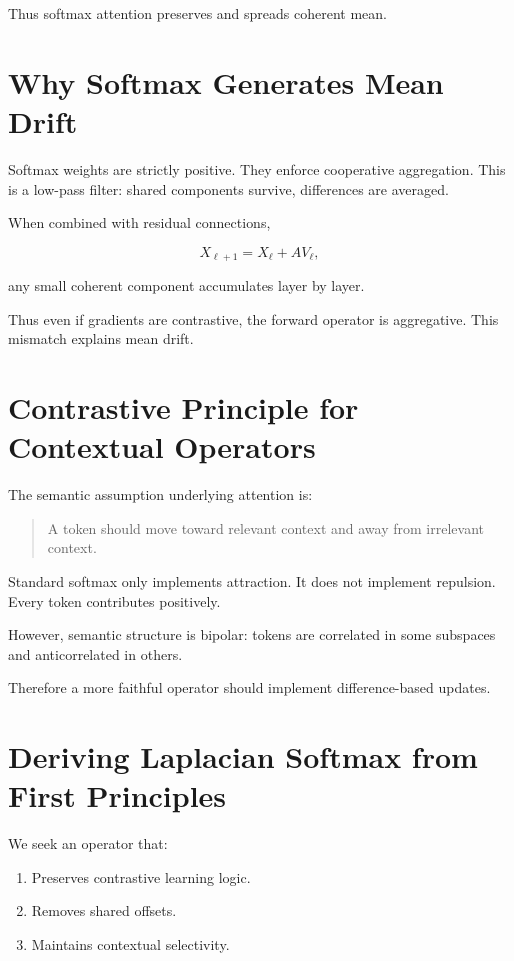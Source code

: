 Thus softmax attention preserves and spreads coherent mean.

\section{Why Softmax Generates Mean Drift}

Softmax weights are strictly positive.
They enforce cooperative aggregation.
This is a low-pass filter:
shared components survive,
differences are averaged.

When combined with residual connections,

\begin{equation}
X_{\ell+1} = X_\ell + AV_\ell,
\end{equation}

any small coherent component
accumulates layer by layer.

Thus even if gradients are contrastive,
the forward operator is aggregative.
This mismatch explains mean drift.

\section{Contrastive Principle for Contextual Operators}

The semantic assumption underlying attention is:

\begin{quote}
A token should move toward relevant context and away from irrelevant context.
\end{quote}

Standard softmax only implements attraction.
It does not implement repulsion.
Every token contributes positively.

However, semantic structure is bipolar:
tokens are correlated in some subspaces
and anticorrelated in others.

Therefore a more faithful operator should implement
difference-based updates.

\section{Deriving Laplacian Softmax from First Principles}

We seek an operator that:

\begin{enumerate}
\item Preserves contrastive learning logic.
\item Removes shared offsets.
\item Maintains contextual selectivity.
\end{enumerate}

